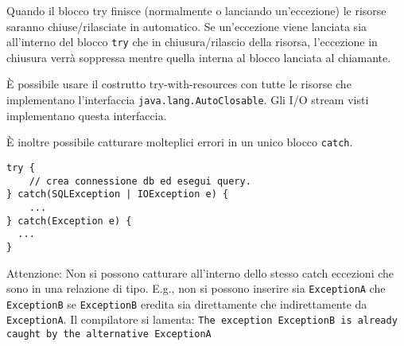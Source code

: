 Quando il blocco try finisce (normalmente o lanciando un'eccezione) le risorse saranno chiuse/rilasciate in automatico. Se un'eccezione viene lanciata sia all'interno del blocco \texttt{try} che in chiusura/rilascio della risorsa, l'eccezione in chiusura verr\`a soppressa mentre quella interna al blocco lanciata al chiamante.

\`E possibile usare il costrutto try-with-resources con tutte le risorse che implementano l’interfaccia \texttt{java.lang.AutoClosable}. Gli I/O stream visti implementano questa interfaccia.

\`E inoltre possibile catturare molteplici errori in un unico blocco \texttt{catch}.

\begin{lstlisting}
try {
	// crea connessione db ed esegui query.
} catch(SQLException | IOException e) {
	...
} catch(Exception e) {
  ...
}
\end{lstlisting}

Attenzione: Non si possono catturare all'interno dello stesso catch eccezioni che sono in una relazione di tipo. E.g., non si possono inserire sia \texttt{ExceptionA} che \texttt{ExceptionB} se \texttt{ExceptionB} eredita sia direttamente che indirettamente da \texttt{ExceptionA}. Il compilatore si lamenta: \texttt{The exception ExceptionB is already caught by the alternative ExceptionA}
